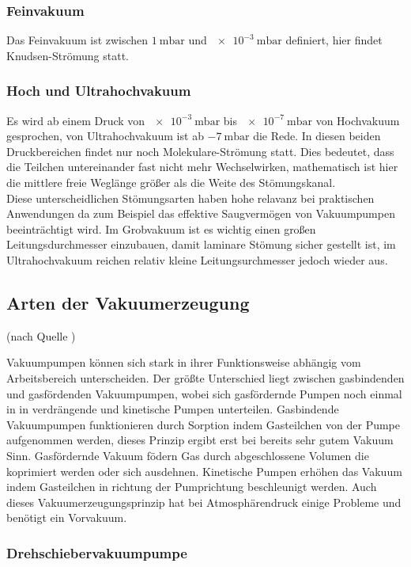 		\subsubsection{Feinvakuum}

			Das Feinvakuum ist zwischen $\SI{1}{\milli\bar}$ und $\SI{e-3}{\milli\bar}$ definiert, hier findet Knudsen-Strömung statt.

		\subsubsection{Hoch und Ultrahochvakuum} 
			Es wird ab einem Druck von $\SI{e-3}{\milli\bar}$ bis $\SI{e-7}{\milli\bar}$ von Hochvakuum gesprochen, von Ultrahochvakuum ist ab $\SI{-7}{\milli\bar}$ die Rede.		
			In diesen beiden Druckbereichen findet nur noch Molekulare-Strömung statt.
			Dies bedeutet, dass die Teilchen untereinander fast nicht mehr Wechselwirken, mathematisch ist hier die mittlere freie Weglänge größer als die Weite des Stömungskanal.
		\\
		Diese unterscheidlichen Stömungsarten haben hohe relavanz bei praktischen Anwendungen da zum Beispiel das effektive Saugvermögen von Vakuumpumpen beeinträchtigt wird.
		Im Grobvakuum ist es wichtig einen großen Leitungsdurchmesser einzubauen, damit laminare Stömung sicher gestellt ist,
		im Ultrahochvakuum reichen relativ kleine Leitungsurchmesser jedoch wieder aus.

	\subsection{Arten der Vakuumerzeugung}(nach Quelle \cite{peiffer})
		
		Vakuumpumpen können sich stark in ihrer Funktionsweise abhängig vom Arbeitsbereich unterscheiden.		
		Der größte Unterschied liegt zwischen gasbindenden und gasfördenden Vakuumpumpen, wobei sich gasfördernde Pumpen noch einmal in in verdrängende und kinetische Pumpen unterteilen.
		Gasbindende Vakuumpumpen funktionieren durch Sorption indem Gasteilchen von der Pumpe aufgenommen werden, dieses Prinzip ergibt erst bei bereits sehr gutem Vakuum Sinn.  Gasfördernde Vakuum födern Gas durch abgeschlossene Volumen die koprimiert werden oder sich ausdehnen.
		Kinetische Pumpen erhöhen das Vakuum indem Gasteilchen in richtung der Pumprichtung beschleunigt werden.
		Auch dieses Vakuumerzeugungsprinzip hat bei Atmosphärendruck einige Probleme und benötigt ein Vorvakuum.

		\subsubsection{Drehschiebervakuumpumpe} 
						
